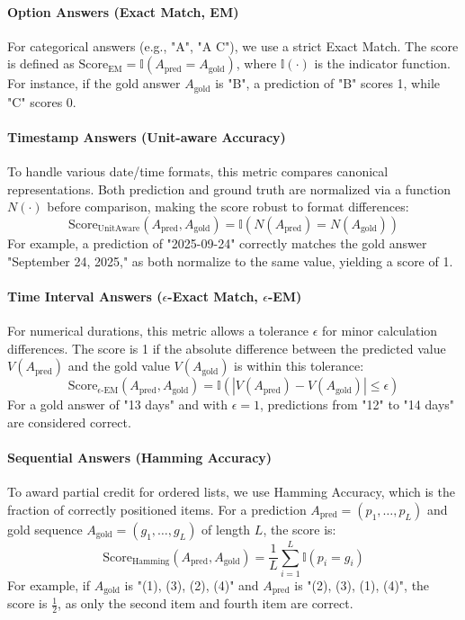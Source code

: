 \documentclass{article} %
\begin{document}
\paragraph{Option Answers (Exact Match, EM)}
For categorical answers (e.g., "A", "A C"), we use a strict Exact Match. The score is defined as $\text{Score}_{\text{EM}} = \mathbb{I}(A_{\text{pred}} = A_{\text{gold}})$, where $\mathbb{I}(\cdot)$ is the indicator function. For instance, if the gold answer $A_{\text{gold}}$ is "B", a prediction of "B" scores 1, while "C" scores 0.

\paragraph{Timestamp Answers (Unit-aware Accuracy)}
To handle various date/time formats, this metric compares canonical representations. Both prediction and ground truth are normalized via a function $N(\cdot)$ before comparison, making the score robust to format differences:
\[
\text{Score}_{\text{UnitAware}}(A_{\text{pred}}, A_{\text{gold}}) = \mathbb{I}(N(A_{\text{pred}}) = N(A_{\text{gold}}))
\]
For example, a prediction of "2025-09-24" correctly matches the gold answer "September 24, 2025," as both normalize to the same value, yielding a score of 1.

\paragraph{Time Interval Answers ($\epsilon$-Exact Match, $\epsilon$-EM)}
For numerical durations, this metric allows a tolerance $\epsilon$ for minor calculation differences. The score is 1 if the absolute difference between the predicted value $V(A_{\text{pred}})$ and the gold value $V(A_{\text{gold}})$ is within this tolerance:
\[
\text{Score}_{\epsilon\text{-EM}}(A_{\text{pred}}, A_{\text{gold}}) = \mathbb{I}(|V(A_{\text{pred}}) - V(A_{\text{gold}})| \le \epsilon)
\]
For a gold answer of "13 days" and with $\epsilon=1$, predictions from "12" to "14 days" are considered correct.

\paragraph{Sequential Answers (Hamming Accuracy)}
To award partial credit for ordered lists, we use Hamming Accuracy, which is the fraction of correctly positioned items. For a prediction $A_{\text{pred}}=(p_1, \dots, p_L)$ and gold sequence $A_{\text{gold}}=(g_1, \dots, g_L)$ of length $L$, the score is:
\[
\text{Score}_{\text{Hamming}}(A_{\text{pred}}, A_{\text{gold}}) = \frac{1}{L} \sum_{i=1}^{L} \mathbb{I}(p_i = g_i)
\]
For example, if $A_{\text{gold}}$ is "(1), (3), (2), (4)" and $A_{\text{pred}}$ is "(2), (3), (1), (4)", the score is $\frac{1}{2}$, as only the second item and fourth item are correct.
\end{document}
